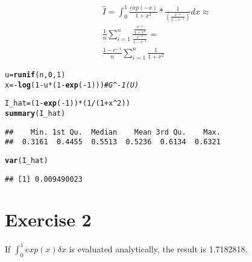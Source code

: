 \documentclass{article}\usepackage[]{graphicx}\usepackage[]{color}
\makeatletter
\newcommand{\hlnum}[1]{\textcolor[rgb]{0.686,0.059,0.569}{#1}}%
\newcommand{\hlcom}[1]{\textcolor[rgb]{0.678,0.584,0.686}{\textit{#1}}}%
\newcommand{\hlopt}[1]{\textcolor[rgb]{0,0,0}{#1}}%
\newcommand{\hlstd}[1]{\textcolor[rgb]{0.345,0.345,0.345}{#1}}%
\newcommand{\hlkwb}[1]{\textcolor[rgb]{0.69,0.353,0.396}{#1}}%
\newcommand{\hlkwd}[1]{\textcolor[rgb]{0.737,0.353,0.396}{\textbf{#1}}}%
\newenvironment{kframe}{%
 \def\at@end@of@kframe{}%
 \ifinner\ifhmode%
  \def\at@end@of@kframe{\end{minipage}}%
  \begin{minipage}{\columnwidth}%
 \fi\fi%
 \def\FrameCommand##1{\hskip\@totalleftmargin \hskip-\fboxsep
 \colorbox{shadecolor}{##1}\hskip-\fboxsep
     \hskip-\linewidth \hskip-\@totalleftmargin \hskip\columnwidth}%
 \MakeFramed {\advance\hsize-\width
   \@totalleftmargin\z@ \linewidth\hsize
   \@setminipage}}%
 {\par\unskip\endMakeFramed%
 \at@end@of@kframe}
\newenvironment{knitrout}{}{} %
\makeatother
\begin{document}
\begin{equation}
\begin{split}
  \hat{I} = \int_{0}^{1} \frac{exp(-x)}{1+x^2}*\frac{1}{(\frac{e^{-x}}{1-e^{-1}})} dx \approx \\
  \frac{1}{n}\sum_{i=1}^{n} \frac{\frac{e^{-x}}{1+x^2}}{\frac{e^{-x}}{1-e^{-1}}} = \\
  \frac{1-e^{-1}}{n}\sum_{i=1}^{n}\frac{1}{1+x^2}
  \end{split}
\end{equation}
\begin{knitrout}
\color{fgcolor}\begin{kframe}
\begin{alltt}
\hlstd{u} \hlkwb{=} \hlkwd{runif}\hlstd{(n,}\hlnum{0}\hlstd{,}\hlnum{1}\hlstd{)}
\hlstd{x} \hlkwb{=} \hlopt{-}\hlkwd{log}\hlstd{(}\hlnum{1}\hlopt{-}\hlstd{u}\hlopt{*}\hlstd{(}\hlnum{1}\hlopt{-}\hlkwd{exp}\hlstd{(}\hlopt{-}\hlnum{1}\hlstd{)))} \hlcom{#G^-1(U)}

\hlstd{I_hat} \hlkwb{=} \hlstd{(}\hlnum{1}\hlopt{-}\hlkwd{exp}\hlstd{(}\hlopt{-}\hlnum{1}\hlstd{))}\hlopt{*}\hlstd{(}\hlnum{1}\hlopt{/}\hlstd{(}\hlnum{1}\hlopt{+}\hlstd{x}\hlopt{^}\hlnum{2}\hlstd{))}
\hlkwd{summary}\hlstd{(I_hat)}
\end{alltt}
\begin{verbatim}
##    Min. 1st Qu.  Median    Mean 3rd Qu.    Max. 
##  0.3161  0.4455  0.5513  0.5236  0.6134  0.6321
\end{verbatim}
\begin{alltt}
\hlkwd{var}\hlstd{(I_hat)}
\end{alltt}
\begin{verbatim}
## [1] 0.009490023
\end{verbatim}
\end{kframe}
\end{knitrout}
\section*{Exercise 2}
If $\int_{0}^{1} exp(x) \delta x$ is evaluated analytically, the result is 1.7182818.
\end{document}

